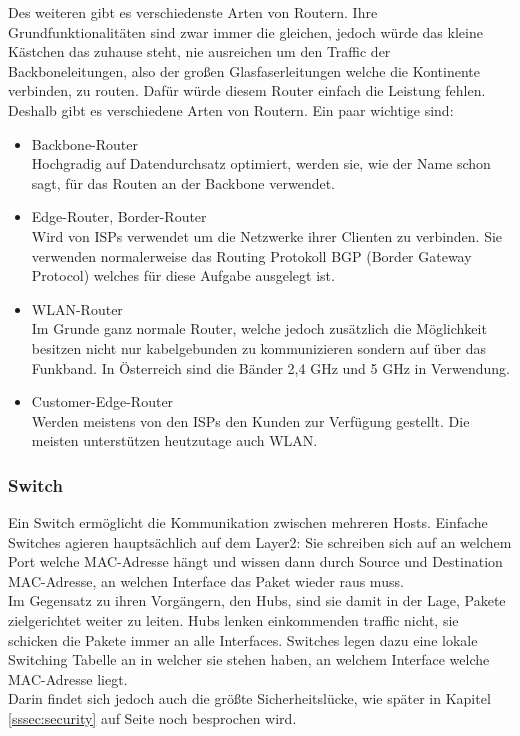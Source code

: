 \documentclass[11pt,a4paper]{report}
\begin{document}
Des weiteren gibt es verschiedenste Arten von Routern. Ihre Grundfunktionalitäten sind zwar immer die gleichen, jedoch würde das kleine Kästchen das zuhause steht, nie ausreichen um den Traffic der Backboneleitungen, also der großen Glasfaserleitungen welche die Kontinente verbinden, zu routen. Dafür würde diesem Router einfach die Leistung fehlen.\\
Deshalb gibt es verschiedene Arten von Routern. Ein paar wichtige sind:\\
\begin{itemize}
\item Backbone-Router\\
Hochgradig auf Datendurchsatz optimiert, werden sie, wie der Name schon sagt, für das Routen an der Backbone verwendet.
\item Edge-Router, Border-Router\\
Wird von ISPs verwendet um die Netzwerke ihrer Clienten zu verbinden. Sie verwenden normalerweise das Routing Protokoll BGP (Border Gateway Protocol) welches für diese Aufgabe ausgelegt ist.
\item WLAN-Router\\
Im Grunde ganz normale Router, welche jedoch zusätzlich die Möglichkeit besitzen nicht nur kabelgebunden zu kommunizieren sondern auf über das Funkband. In Österreich sind die Bänder 2,4 GHz und 5 GHz in Verwendung.
\item Customer-Edge-Router\\
Werden meistens von den ISPs den Kunden zur Verfügung gestellt. Die meisten unterstützen heutzutage auch WLAN.
\end{itemize}
\subsubsection{Switch}
Ein Switch ermöglicht die Kommunikation zwischen mehreren Hosts. Einfache Switches agieren hauptsächlich auf dem Layer2: Sie schreiben sich auf an welchem Port welche MAC-Adresse hängt und wissen dann durch Source und Destination MAC-Adresse, an welchen Interface das Paket wieder raus muss.\\

Im Gegensatz zu ihren Vorgängern, den Hubs, sind sie damit in der Lage, Pakete zielgerichtet weiter zu leiten. Hubs lenken einkommenden traffic nicht, sie schicken die Pakete immer an alle Interfaces. Switches legen dazu eine lokale Switching Tabelle an in welcher sie stehen haben, an welchem Interface welche MAC-Adresse liegt.\\
Darin findet sich jedoch auch die größte Sicherheitslücke, wie später in Kapitel \ref{sssec:security} auf Seite \pageref{sssec:security} noch besprochen wird.\\
\end{document}
